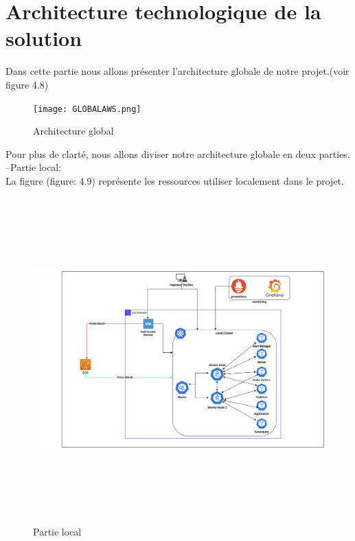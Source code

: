 \section{\selectfont\Large Architecture technologique de la solution}
\textsf{\selectfont{} Dans cette partie nous allons présenter l'architecture globale de notre projet.(voir figure 4.8)}
\begin{landscape}
  \begin{figure}[htbp]
    \centering
  \texttt{[image: GLOBALAWS.png]}  
    \caption{Architecture global}
  \end{figure}
\end{landscape}
\textsf{\selectfont{} Pour plus de clarté, nous allons diviser notre architecture globale en deux parties.\\
\indent--Partie local: \\[0.02cm]
La figure (figure: 4.9) représente les ressources utiliser localement dans le projet.
}
\linebreak
\begin{figure}[H]
\centering
\includegraphics[width=15cm,height=12.5cm]{LOCAL.drawio.png}

  \caption{Partie local}
\end{figure}
